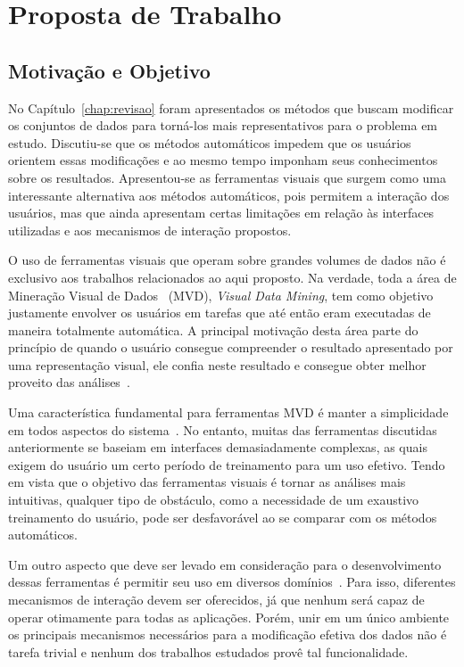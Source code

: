 \chapter{Proposta de Trabalho}\label{chap:proposta}

\section{Motivação e Objetivo}

No Capítulo~\ref{chap:revisao} foram apresentados os métodos
que buscam modificar os conjuntos de dados para torná-los
mais representativos para o problema em estudo.  Discutiu-se
que os métodos automáticos impedem que os usuários orientem
essas modificações e ao mesmo tempo imponham seus
conhecimentos sobre os resultados.  Apresentou-se as
ferramentas visuais que surgem como uma interessante
alternativa aos métodos automáticos, pois permitem a
interação dos usuários, mas que ainda apresentam certas
limitações em relação às interfaces utilizadas e aos
mecanismos de interação propostos.

O uso de ferramentas visuais que operam sobre grandes
volumes de dados não é exclusivo aos trabalhos relacionados
ao aqui proposto. Na verdade, toda a área de
Mineração Visual de Dados~\cite{Wong1999} (MVD),
\emph{Visual Data Mining}, tem como objetivo justamente
envolver os usuários em tarefas que até então eram
executadas de maneira totalmente automática. A principal
motivação desta área parte do princípio de quando o usuário
consegue compreender o resultado apresentado por uma
representação visual, ele confia neste resultado e
consegue obter melhor proveito das análises~\cite{Wong1999}.

Uma característica fundamental para ferramentas MVD é manter
a simplicidade em todos aspectos do sistema~\cite{Wong1999}.
No entanto, muitas das ferramentas discutidas anteriormente
se baseiam em interfaces demasiadamente complexas, as quais
exigem do usuário um certo período de treinamento para um
uso efetivo. Tendo em vista que o objetivo das ferramentas
visuais é tornar as análises mais intuitivas, qualquer tipo
de obstáculo, como a necessidade de um exaustivo treinamento
do usuário, pode ser desfavorável ao se comparar com os
métodos automáticos.

Um outro aspecto que deve ser levado em consideração para o
desenvolvimento dessas ferramentas é permitir seu uso em
diversos domínios~\cite{Wong1999}. Para isso, diferentes
mecanismos de interação devem ser oferecidos, já que nenhum
será capaz de operar otimamente para todas as
aplicações. Porém, unir em um único ambiente os principais
mecanismos necessários para a modificação efetiva dos dados
não é tarefa trivial e nenhum dos trabalhos estudados provê
tal funcionalidade.

